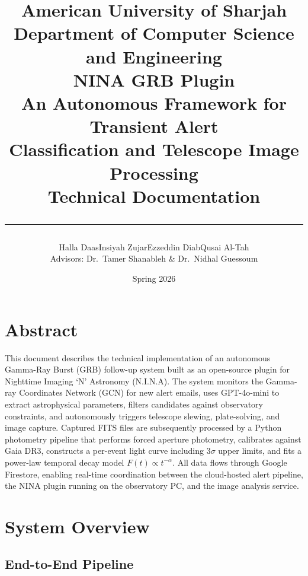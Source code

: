 \documentclass[12pt,a4paper]{article}
\title{
    \vspace{-1cm}
    {\large American University of Sharjah}\\[0.4cm]
    {\large Department of Computer Science and Engineering}\\[1.2cm]
    {\LARGE \textbf{NINA GRB Plugin}}\\[0.3cm]
    {\Large An Autonomous Framework for Transient Alert\\
    Classification and Telescope Image Processing}\\[0.5cm]
    {\large Technical Documentation}\\[0.8cm]
    \rule{\textwidth}{0.5pt}
}
\author{
    Halla Daas\quad Insiyah Zujar\quad Ezzeddin Diab\quad Qusai Al-Tah\\[0.3cm]
    \small Advisors: Dr.\ Tamer Shanableh \& Dr.\ Nidhal Guessoum
}
\date{Spring 2026}
\begin{document}
\maketitle
\thispagestyle{empty}
\newpage

\tableofcontents
\newpage

\section{Abstract}

This document describes the technical implementation of an autonomous
Gamma-Ray Burst (GRB) follow-up system built as an open-source plugin for
Nighttime Imaging `N' Astronomy (N.I.N.A). The system monitors the
Gamma-ray Coordinates Network (GCN) for new alert emails, uses GPT-4o-mini
to extract astrophysical parameters, filters candidates against observatory
constraints, and autonomously triggers telescope slewing, plate-solving, and
image capture. Captured FITS files are subsequently processed by a Python
photometry pipeline that performs forced aperture photometry, calibrates
against Gaia DR3, constructs a per-event light curve including 3$\sigma$
upper limits, and fits a power-law temporal decay model
$F(t) \propto t^{-\alpha}$. All data flows through Google Firestore, enabling
real-time coordination between the cloud-hosted alert pipeline, the NINA
plugin running on the observatory PC, and the image analysis service.

\section{System Overview}

\subsection{End-to-End Pipeline}
\end{document}
